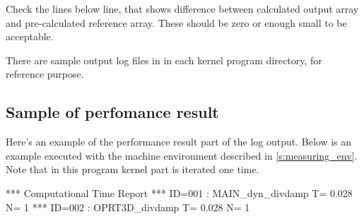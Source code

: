 Check the lines below  line,
that shows difference between calculated output array and
pre-calculated reference array.
These should be zero or enough small to be acceptable.

There are sample output log files in 
in each kernel program directory, for reference purpose.


\subsection{Sample of perfomance result}


Here's an example of the performance result part of the log output.
Below is an example executed with the machine environment described in \autoref{s:measuring_env}.
%
Note that in this program kernel part is iterated one time.

\begin{LstLog}
 *** Computational Time Report
 *** ID=001 : MAIN_dyn_divdamp                 T=     0.028 N=      1
 *** ID=002 : OPRT3D_divdamp                   T=     0.028 N=      1
\end{LstLog}

